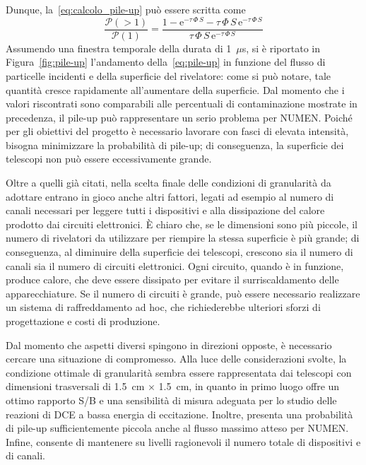 Dunque, la~\ref{eq:calcolo_pile-up} può essere scritta come
\begin{equation} \label{eq:pile-up}
\frac{\mathcal{P}(> \! 1)}{\mathcal{P}(1)} = \frac{1 - 
	\mbox{e}^{- \tau \, \Phi \, S} - \tau \, \Phi \, S \,\mbox{e}^{- \tau\, \Phi \, S}}{\tau \, \Phi \, S \, \mbox{e}^{- \tau \, \Phi \, S}}
\end{equation} 
Assumendo una finestra temporale della durata di 1~$\mu$s, si è riportato in Figura~\ref{fig:pile-up} l'andamento della~\ref{eq:pile-up} in funzione del flusso di particelle incidenti e della superficie del rivelatore: come si può notare, tale quantità cresce rapidamente all'aumentare della superficie.
Dal momento che i valori riscontrati sono comparabili alle percentuali di contaminazione mostrate in precedenza, il pile-up può rappresentare un serio problema per NUMEN.
Poiché per gli obiettivi del progetto è necessario lavorare con fasci di elevata intensità, bisogna minimizzare la probabilità di pile-up; di conseguenza, la superficie dei telescopi non può essere eccessivamente grande.






Oltre a quelli già citati, nella scelta finale delle condizioni di granularità da adottare entrano in gioco anche altri fattori, legati ad esempio al numero di canali necessari per leggere tutti i dispositivi e alla dissipazione del calore prodotto dai circuiti elettronici.
È chiaro che, se le dimensioni sono più piccole, il numero di rivelatori da utilizzare per riempire la stessa superficie è più grande; di conseguenza, al diminuire della superficie dei telescopi, crescono sia il numero di canali sia il numero di circuiti elettronici.
Ogni circuito, quando è in funzione, produce calore, che deve essere dissipato per evitare il surriscaldamento delle apparecchiature.
Se il numero di circuiti è grande, può essere necessario realizzare un sistema di raffreddamento ad hoc, che richiederebbe ulteriori sforzi di progettazione e costi di produzione.

Dal momento che aspetti diversi spingono in direzioni opposte, è necessario cercare una situazione di compromesso.
Alla luce delle considerazioni svolte, la condizione ottimale di granularità sembra essere rappresentata dai telescopi con dimensioni trasversali di 1.5~cm $\times$ 1.5~cm, in quanto in primo luogo offre un ottimo rapporto S/B e una sensibilità di misura adeguata per lo studio delle reazioni di DCE a bassa energia di eccitazione.
Inoltre, presenta una probabilità di pile-up sufficientemente piccola anche al flusso massimo atteso per NUMEN.
Infine, consente di mantenere su livelli ragionevoli il numero totale di dispositivi e di canali.


